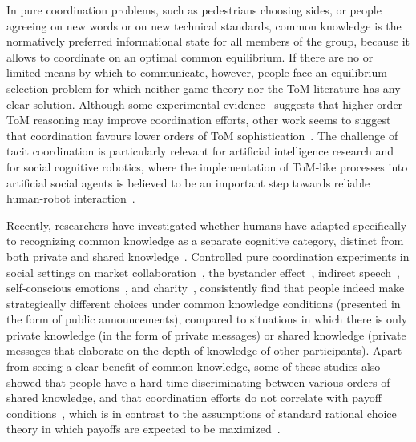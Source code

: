 \documentclass[twocolumn,a4paper,superscriptaddress,nofootinbib]{revtex4}
\begin{document}
In pure coordination problems, such as pedestrians choosing sides, or people agreeing on new words or on new technical standards, common knowledge is the normatively preferred informational state for all members of the group, because it allows to coordinate on an optimal common equilibrium. If there are no or limited means by which to communicate, however, people face an equilibrium-selection problem for which neither game theory nor the ToM literature has any clear solution. Although some experimental evidence~\citep{curry2012putting} suggests that higher-order ToM reasoning may improve coordination efforts, other work seems to suggest that coordination favours lower orders of ToM sophistication~\citep{ devaine2014theory, de2015higher}. The challenge of tacit coordination is particularly relevant for artificial intelligence research and for social cognitive robotics, where the implementation of ToM-like processes into artificial social agents is believed to be an important step towards reliable human-robot interaction~\citep{erb2016artificial, bolander2018seeing, bard2020hanabi, dissing2020implementing}.

Recently, researchers have investigated whether humans have adapted specifically to recognizing common knowledge as a separate cognitive category, distinct from both private and shared knowledge~\citep{de2019common}. Controlled pure coordination experiments in social settings on market collaboration~\citep{thomas2014psychology}, the bystander effect~\citep{thomas2016recursive}, indirect speech~\citep{lee2010rationales}, self-conscious emotions~\citep{thomas2018common}, and charity~\citep{de2019maimonides}, consistently find that people indeed make strategically different choices under common knowledge conditions (presented in the form of public announcements), compared to situations in which there is only private knowledge (in the form of private messages) or shared knowledge (private messages that elaborate on the depth of knowledge of other participants). Apart from seeing a clear benefit of common knowledge, some of these studies also showed that people have a hard time discriminating between various orders of shared knowledge, and that coordination efforts do not correlate with payoff conditions~\citep{thomas2014psychology}, which is in contrast to the assumptions of standard rational choice theory in which payoffs are expected to be maximized~\citep{becker1976economic}.
\end{document}
